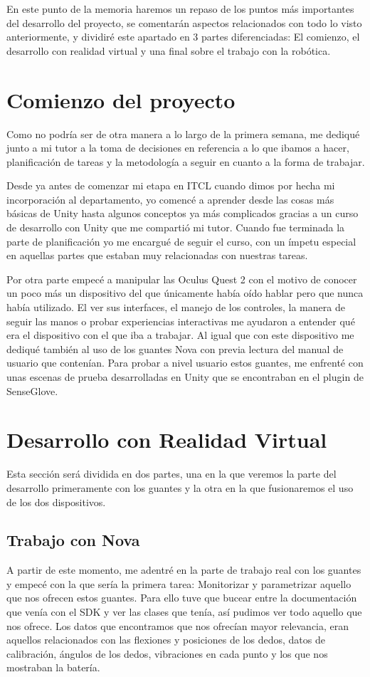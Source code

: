 En este punto de la memoria haremos un repaso de los puntos más importantes del desarrollo del proyecto, se comentarán aspectos relacionados con todo lo visto anteriormente, y dividiré este apartado en 3 partes diferenciadas: El comienzo, el desarrollo con realidad virtual y una final sobre el trabajo con la robótica\cite{Robotica}.

\section{Comienzo del proyecto}
Como no podría ser de otra manera a lo largo de la primera semana, me dediqué junto a mi tutor a la toma de decisiones en referencia a lo que ibamos a hacer, planificación de tareas y la metodología a seguir en cuanto a la forma de trabajar. 

Desde ya antes de comenzar mi etapa en ITCL cuando dimos por hecha mi incorporación al departamento, yo comencé a aprender desde las cosas más básicas de Unity hasta algunos conceptos ya más complicados gracias a un curso de desarrollo con Unity que me compartió mi tutor. Cuando fue terminada la parte de planificación yo me encargué de seguir el curso, con un ímpetu especial en aquellas partes que estaban muy relacionadas con nuestras tareas. 

Por otra parte empecé a manipular las Oculus Quest 2 \cite{Quest2} con el motivo de conocer un poco más un dispositivo del que únicamente había oído hablar pero que nunca había utilizado. El ver sus interfaces, el manejo de los controles, la manera de seguir las manos o probar experiencias interactivas me ayudaron a entender qué era el dispositivo con el que iba a trabajar. Al igual que con este dispositivo me dediqué también al uso de los guantes Nova\cite{SGloveNova} con previa lectura del manual de usuario que contenían. Para probar a nivel usuario estos guantes, me enfrenté con unas escenas de prueba desarrolladas en Unity que se encontraban en el plugin de SenseGlove.

\section{Desarrollo con Realidad Virtual}
Esta sección será dividida en dos partes, una en la que veremos la parte del desarrollo primeramente con los guantes y la otra en la que fusionaremos el uso de los dos dispositivos.
\subsection{Trabajo con Nova\cite{SGloveNova}}
A partir de este momento, me adentré en la parte de trabajo real con los guantes y empecé con la que sería la primera tarea: Monitorizar y parametrizar aquello que nos ofrecen estos guantes.   Para ello tuve que bucear entre la documentación que venía con el SDK y ver las clases que tenía, así pudimos ver todo aquello que nos ofrece. Los datos que encontramos que nos ofrecían mayor relevancia, eran aquellos relacionados con las flexiones y posiciones de los dedos, datos de calibración, ángulos de los dedos, vibraciones en cada punto y los que nos mostraban la batería. 

